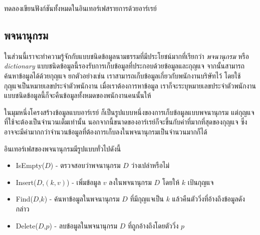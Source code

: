 \begin{quiz}{}
ทดลอง{\wbr}เขียน{\wbr}ฟังก์ชัน{\wbr}ทั้งหมด{\wbr}ใน{\wbr}อิน{\wbr}เทอร์เฟส{\wbr}รายการ{\wbr}ด้วย{\wbr}อาร์เรย์
\end{quiz}

\subsection{พจนานุกรม}
ใน{\wbr}ส่วน{\wbr}นี้{\wbr}เรา{\wbr}จะ{\wbr}ทำ{\wbr}ความ{\wbr}รู้จัก{\wbr}กับ{\wbr}แบบ{\wbr}ชนิด{\wbr}ข้อมูล{\wbr}นามธรรม{\wbr}ที่{\wbr}มี{\wbr}ประโยชน์{\wbr}มาก{\wbr}ที่{\wbr}เรียก{\wbr}ว่า {\em
  พจนานุกรม} หรือ {\em dictionary}
แบบ{\wbr}ชนิด{\wbr}ข้อมูล{\wbr}นี้{\wbr}รองรับ{\wbr}การ{\wbr}เก็บ{\wbr}ข้อมูล{\wbr}ที่{\wbr}ประกอบ{\wbr}ด้วย{\wbr}ข้อมูล{\wbr}และ{\wbr}กุญแจ{\wbr}
จากนั้น{\wbr}สามารถ{\wbr}ค้นหา{\wbr}ข้อมูล{\wbr}ได้{\wbr}ด้วย{\wbr}กุญแจ ยก{\wbr}ตัวอย่าง{\wbr}เช่น{\wbr}
เรา{\wbr}สามารถ{\wbr}เก็บ{\wbr}ข้อมูล{\wbr}เกี่ยวกับ{\wbr}พนักงาน{\wbr}บริษัท{\wbr}ไว้ โดย{\wbr}ใช้{\wbr}กุญแจ{\wbr}เป็น{\wbr}หมายเลข{\wbr}ประจำตัว{\wbr}พนักงาน{\wbr}
เมื่อ{\wbr}เรา{\wbr}ต้องการ{\wbr}หา{\wbr}ข้อมูล เรา{\wbr}ก็{\wbr}จะ{\wbr}ระบุ{\wbr}หมายเลข{\wbr}ประจำตัว{\wbr}พนักงาน{\wbr}
แบบ{\wbr}ชนิด{\wbr}ข้อมูล{\wbr}นี้{\wbr}ก็{\wbr}จะ{\wbr}คืน{\wbr}ข้อมูล{\wbr}ทั้งหมด{\wbr}ของ{\wbr}พนักงาน{\wbr}คน{\wbr}นั้น{\wbr}ให้{\wbr}

ใน{\wbr}มุม{\wbr}หนึ่ง{\wbr}โครงสร้าง{\wbr}ข้อมูล{\wbr}แบบ{\wbr}อาร์เรย์ ก็{\wbr}เป็น{\wbr}รูปแบบ{\wbr}หนึ่ง{\wbr}ของ{\wbr}การ{\wbr}เก็บ{\wbr}ข้อมูล{\wbr}แบบ{\wbr}พจนานุกรม{\wbr}
แต่{\wbr}กุญแจ{\wbr}ที่{\wbr}ใช้{\wbr}จะ{\wbr}ต้อง{\wbr}เป็น{\wbr}จำนวนเต็ม{\wbr}เท่านั้น{\wbr}
นอกจากนี้{\wbr}ขนาด{\wbr}ของ{\wbr}อาร์เรย์{\wbr}ก็{\wbr}จะ{\wbr}ขึ้น{\wbr}กับ{\wbr}ค่า{\wbr}ที่{\wbr}มาก{\wbr}ที่สุด{\wbr}ของ{\wbr}กุญแจ{\wbr}
ซึ่ง{\wbr}อาจ{\wbr}จะ{\wbr}มี{\wbr}ค่า{\wbr}มาก{\wbr}กว่า{\wbr}จำนวน{\wbr}ข้อมูล{\wbr}ที่{\wbr}ต้องการ{\wbr}เก็บ{\wbr}ลง{\wbr}ใน{\wbr}พจนานุกรม{\wbr}เป็น{\wbr}จำนวน{\wbr}มาก{\wbr}ก็ได้{\wbr}

อิน{\wbr}เทอร์เฟส{\wbr}ของ{\wbr}พจนานุกรม{\wbr}มี{\wbr}รูปแบบ{\wbr}ทั่วไป{\wbr}ดังนี้{\wbr}
\begin{itemize}
\item IsEmpty($D$) - ตรวจสอบ{\wbr}ว่า{\wbr}พจนานุกรม $D$ ว่างเปล่า{\wbr}หรือ{\wbr}ไม่{\wbr}
\item Insert($D$,$(k,v)$) - เพิ่ม{\wbr}ข้อมูล $v$ ลง{\wbr}ใน{\wbr}พจนานุกรม $D$ โดย{\wbr}ให้ $k$ เป้{\wbr}น{\wbr}กุญแจ{\wbr}
\item Find($D$,$k$) - ค้นหา{\wbr}ข้อมูล{\wbr}ใน{\wbr}พจนานุกรม $D$ ที่{\wbr}มี{\wbr}กุญแจ{\wbr}เป็น $k$
  แล้ว{\wbr}คืนตัว{\wbr}วิ่ง{\wbr}ที่{\wbr}อ้าง{\wbr}ถึง{\wbr}ข้อมูล{\wbr}ดังกล่าว{\wbr}
\item Delete($D$,$p$) - ลบ{\wbr}ข้อมูล{\wbr}ใน{\wbr}พจนานุกรม $D$ ที่{\wbr}ถูก{\wbr}อ้าง{\wbr}ถึง{\wbr}โดย{\wbr}ตัว{\wbr}วิ่ง $p$
\end{itemize}

